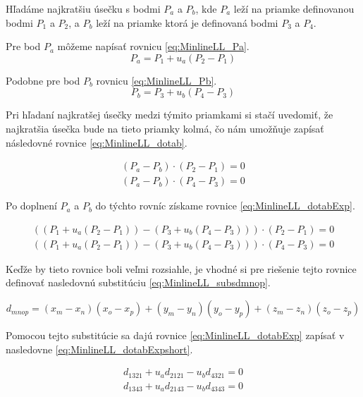 Hľadáme najkratšiu úsečku s bodmi $P_a$ a $P_b$, kde $P_a$ leží na priamke definovanou bodmi $P_1$ a $P_2$, a $P_b$ leží na priamke ktorá je definovaná bodmi $P_3$ a $P_4$.

Pre bod $P_a$ môžeme napísať rovnicu  \ref{eq:MinlineLL_Pa}.
\begin{equation}
P_a=P_1 + u_a(P_2-P_1)
    \label{eq:MinlineLL_Pa}
\end{equation}

Podobne pre bod $P_b$ rovnicu \ref{eq:MinlineLL_Pb}.
\begin{equation}
P_b=P_3 + u_b(P_4-P_3)
    \label{eq:MinlineLL_Pb}
\end{equation}

Pri hľadaní najkratšej úsečky medzi týmito priamkami si stačí uvedomiť, že najkratšia úsečka bude na tieto priamky kolmá, čo nám umožňuje zapísať následovné rovnice  \ref{eq:MinlineLL_dotab}.

\begin{equation}
\begin{aligned}
(P_a-P_b) \cdot (P_2-P_1) =0\\
(P_a-P_b) \cdot (P_4-P_3) =0
\end{aligned}
    \label{eq:MinlineLL_dotab}
\end{equation}

Po doplnení  $P_a$ a $P_b$ do týchto rovníc získame rovnice \ref{eq:MinlineLL_dotabExp}.


\begin{equation}
\begin{aligned}
((P_1 + u_a(P_2-P_1))-(P_3 + u_b(P_4-P_3))) \cdot (P_2-P_1) =0\\
((P_1 + u_a(P_2-P_1))-(P_3 + u_b(P_4-P_3))) \cdot (P_4-P_3) =0
\end{aligned}
    \label{eq:MinlineLL_dotabExp}
\end{equation}

Keďže by tieto rovnice boli veľmi rozsiahle, je vhodné si pre riešenie tejto rovnice definovať nasledovnú substitúciu \ref{eq:MinlineLL_subsdmnop}.

\begin{equation}
d_{mnop}=(x_m - x_n)(x_o-x_p)+(y_m - y_n)(y_o-y_p)+(z_m - z_n)(z_o-z_p)
    \label{eq:MinlineLL_subsdmnop}
\end{equation}


Pomocou tejto substitúcie sa dajú rovnice \ref{eq:MinlineLL_dotabExp} zapísať v nasledovne \ref{eq:MinlineLL_dotabExpshort}.


\begin{equation}
\begin{aligned}
d_{1321} + u_a d_{2121} - u_b d_{4321} = 0\\
d_{1343} + u_a d_{2143} - u_b d_{4343} = 0
\end{aligned}
    \label{eq:MinlineLL_dotabExpshort}
\end{equation}

